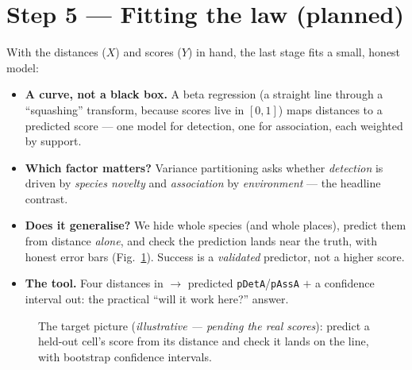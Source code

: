 \documentclass[11pt,a4paper]{article}
\newcommand{\code}[1]{\texttt{#1}}
\begin{document}
\section{Step 5 --- Fitting the law (planned)}
With the distances ($X$) and scores ($Y$) in hand, the last stage fits a small, honest model:
\begin{itemize}
  \item \textbf{A curve, not a black box.} A beta regression (a straight line through a ``squashing''
        transform, because scores live in $[0,1]$) maps distances to a predicted score --- one model for
        detection, one for association, each weighted by support.
  \item \textbf{Which factor matters?} Variance partitioning asks whether \emph{detection} is driven by
        \emph{species novelty} and \emph{association} by \emph{environment} --- the headline contrast.
  \item \textbf{Does it generalise?} We hide whole species (and whole places), predict them from distance
        \emph{alone}, and check the prediction lands near the truth, with honest error bars
        (Fig.~\ref{fig:predline}). Success is a \emph{validated} predictor, not a higher score.
  \item \textbf{The tool.} Four distances in $\to$ predicted \code{pDetA}/\code{pAssA} $+$ a confidence
        interval out: the practical ``will it work here?'' answer.
\end{itemize}

\begin{figure}[h]
\centering
{}
\caption{The target picture (\emph{illustrative --- pending the real scores}): predict a held-out cell's
score from its distance and check it lands on the line, with bootstrap confidence intervals.}
\label{fig:predline}
\end{figure}
\end{document}
